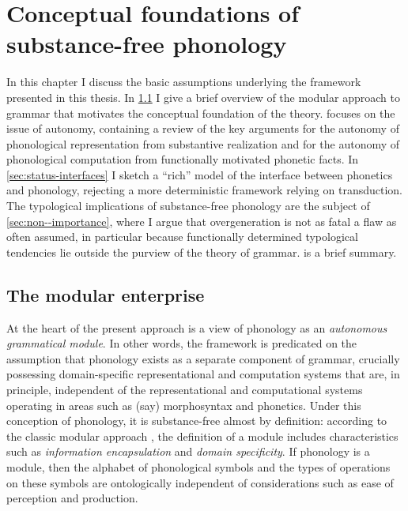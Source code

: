 \chapter{Conceptual foundations of substance-free phonology}
\label{cha:subst-free-phon}

In this chapter I discuss the basic assumptions underlying the framework presented in this thesis. In \cref{sec:modular-enterprise} I give a brief overview of the modular approach to grammar that motivates the conceptual foundation of the theory.  focuses on the issue of autonomy, containing a review of the key arguments for the autonomy of phonological representation from substantive realization and for the autonomy of phonological computation from functionally motivated phonetic facts. In \cref{sec:status-interfaces} I sketch a \enquote{rich} model of the interface between phonetics and phonology, rejecting a more deterministic framework relying on transduction. The typological implications of substance\hyp free phonology are the subject of \cref{sec:non--importance}, where I argue that overgeneration is not as fatal a flaw as often assumed, in particular because functionally determined typological tendencies lie outside the purview of the theory of grammar.  is a brief summary.

\section{The modular enterprise}
\label{sec:modular-enterprise}

At the heart of the present approach is a view of phonology as an \emph{autonomous grammatical module}. In other words, the framework is predicated on the assumption that phonology exists as a separate component of grammar, crucially possessing domain\hyp specific representational and computation systems that are, in principle, independent of the representational and computational systems operating in areas such as (say) morphosyntax and phonetics. Under this conception of phonology, it is substance\hyp free almost by definition: according to the classic modular approach \citep{fodor83:_modul}, the definition of a module includes characteristics such as \emph{information encapsulation} and \emph{domain specificity}. If phonology is a module, then the alphabet of phonological symbols and the types of operations on these symbols are ontologically independent of considerations such as ease of perception and production.

